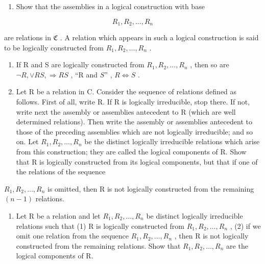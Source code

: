 \begin{enumerate}
\def\labelenumi{(\alph{enumi})}
\tightlist
\item
  Show that the assemblies in a logical construction with base
\end{enumerate}

\[
R _ {1}, R _ {2}, \dots , R _ {n}
\]

are relations in \(\mathfrak{C}\) . A relation which appears in such a logical construction is said to be logically constructed from \(R_{1}, R_{2}, \ldots, R_{n}\) .

\begin{enumerate}
\def\labelenumi{(\alph{enumi})}
\setcounter{enumi}{1}
\item
  If R and S are logically constructed from \(R_{1}, R_{2}, \ldots, R_{n}\) , then so are \(\neg R, \vee RS, \Longrightarrow RS\) , ``R and \(S\)'' , \(R \Longleftrightarrow S\) .
\item
  Let R be a relation in C. Consider the sequence of relations defined as follows. First of all, write R. If R is logically irreducible, stop there. If not, write next the assembly or assemblies antecedent to R (which are well determined relations). Then write the assembly or assemblies antecedent to those of the preceding assemblies which are not logically irreducible; and so on. Let \(R_{1}, R_{2}, \ldots, R_{n}\) be the distinct logically irreducible relations which arise from this construction; they are called the logical components of R. Show that R is logically constructed from its logical components, but that if one of the relations of the sequence
\end{enumerate}

\(R_{1}, R_{2}, \ldots, R_{n}\) is omitted, then R is not logically constructed from the remaining \((n - 1)\) relations.

\begin{enumerate}
\def\labelenumi{(\alph{enumi})}
\setcounter{enumi}{3}
\tightlist
\item
  Let R be a relation and let \(R_{1}, R_{2}, \ldots, R_{n}\) be distinct logically irreducible relations such that (1) R is logically constructed from \(R_{1}, R_{2}, \ldots, R_{n}\) , (2) if we omit one relation from the sequence \(R_{1}, R_{2}, \ldots, R_{n}\) , then R is not logically constructed from the remaining relations. Show that \(R_{1}, R_{2}, \ldots, R_{n}\) are the logical components of R.
\end{enumerate}

